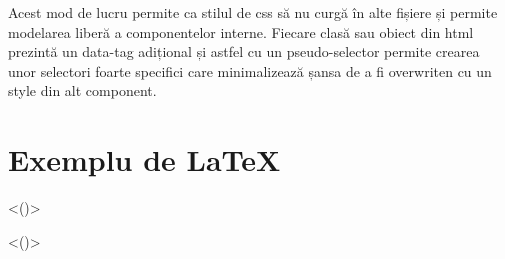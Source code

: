 \documentclass{article}
\begin{document}
Acest mod de lucru permite ca stilul de css să nu curgă în alte
fișiere și permite modelarea liberă a componentelor interne. Fiecare
clasă sau obiect din html prezintă un data-tag adițional și astfel cu
un pseudo-selector permite crearea unor selectori foarte specifici
care minimalizează șansa de a fi overwriten cu un style din alt
component.


\section{Exemplu de \LaTeX}


<()>

<()>
\end{document}

